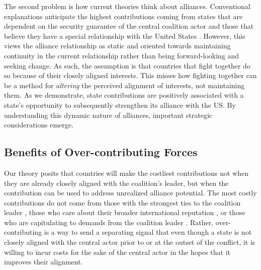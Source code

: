 \documentclass[12pt,letterpaper]{article}
\begin{document}
		The second problem is how current theories think about alliances. Conventional explanations anticipate the highest contributions coming from states that are dependent on the security guarantee of the central coalition actor and those that believe they have a special relationship with the United States \citep{graeger_revivalatlanticismnato_2009, biehl_strategiccultureseurope_2013, howorth_securitydefencepolicy_2014, haesebrouck_democraticparticipationair_2016}. However, this views the alliance relationship as static and oriented towards maintaining continuity in the current relationship rather than being forward-looking and seeking change. As such, the assumption is that countries that fight together do so because of their closely aligned interests. This misses how fighting together can be a method for \textit{altering} the perceived alignment of interests, not maintaining them. As we demonstrate, state contributions are positively associated with a state's opportunity to subsequently strengthen its alliance with the US. By understanding this dynamic nature of alliances, important strategic considerations emerge.
		
	\subsection{Benefits of Over-contributing Forces}
		Our theory posits that countries will make the costliest contributions not when they are already closely aligned with the coalition's leader, but when the contribution can be used to address unrealized alliance potential. The most costly contributions do not come from those with the strongest ties to the coalition leader \citep{ringsmose_natoburdensharingredux_2010, wolford_showing_2014}, those who care about their broader international reputation \citep{pedersen_bandwagonstatuschanging_2018}, or those who are capitulating to demands from the coalition leader \citep{schweller_newrealistresearch_1997}. Rather, over-contributing is a way to send a separating signal that even though a state is not closely aligned with the central actor prior to or at the outset of the conflict, it is willing to incur costs for the sake of the central actor in the hopes that it improves their alignment.
\end{document}

